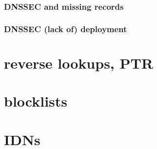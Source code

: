 \subsubsection{DNSSEC and missing records}


\subsubsection{DNSSEC (lack of) deployment}


\section{reverse lookups, PTR}


\section{blocklists}


\section{IDNs}


